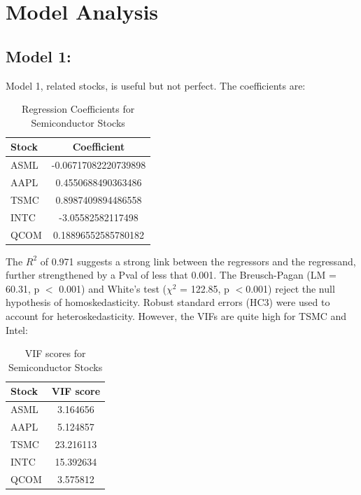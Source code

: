 \documentclass[12pt]{article}
\begin{document}
\vspace{2em}


\section{Model Analysis}

\subsection{Model 1:}

Model 1, related stocks, is useful but not perfect. The coefficients are:


\begin{table}[h]
\centering
\begin{tabular}{lc}
\hline
\textbf{Stock} & \textbf{Coefficient} \\
\hline
ASML & -0.06717082220739898 \\
AAPL & 0.4550688490363486 \\
TSMC & 0.8987409894486558 \\
INTC & -3.05582582117498 \\
QCOM & 0.18896552585780182 \\
\hline
\end{tabular}
\caption{Regression Coefficients for Semiconductor Stocks}
\end{table}


The $R^2$ of 0.971 suggests a strong link between the regressors and the regressand, further strengthened by a Pval of less that 0.001. The Breusch-Pagan (LM = 60.31, p $<$ 0.001) and White's test ($\chi^2$ = 122.85, p $<$0.001) reject the null hypothesis of homoskedasticity. Robust standard errors (HC3) were used to account for heteroskedasticity. However, the VIFs are quite high for TSMC and Intel: 

\begin{table}[h]
\centering
\begin{tabular}{lc}
\hline
\textbf{Stock} & \textbf{VIF score} \\
\hline
ASML & 3.164656 \\
AAPL & 5.124857 \\
TSMC & 23.216113 \\
INTC & 15.392634 \\
QCOM & 3.575812 \\
\hline
\end{tabular}
\caption{VIF scores for Semiconductor Stocks}
\end{table}
\end{document}
